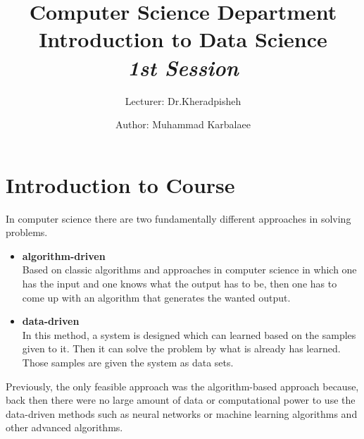 \documentclass[twocolumn,a4paper, 10pt]{article}
\title{\textbf{Computer Science Department} \\ Introduction to Data Science\\ \emph{1st Session}}
\author{Lecturer: Dr.Kheradpisheh}
\date{Author: Muhammad Karbalaee}
\begin{document}
	\tableofcontents
	\posttitle{\end{center}}
	\maketitle
	\section{Introduction to Course}
	In computer science there are two fundamentally different approaches 
	in solving problems.

	\begin{itemize}
		\item \textbf{algorithm-driven} \\ 
			Based on classic algorithms and approaches in computer science 
			in which one has the input and one knows what the output has to be,
			then one has to come up with an algorithm that generates the wanted output. 
		\item \textbf{data-driven} \\
			In this method, a system is designed which can learned based on the samples given to it.
			Then it can solve the problem by what is already has learned. Those samples are given 
			the system as data sets.
	\end{itemize}

	Previously, the only feasible approach was the algorithm-based approach because, back then
	there were no large amount of data or computational power to use the data-driven methods
	such as neural networks or machine learning algorithms and other advanced algorithms.
\end{document}
